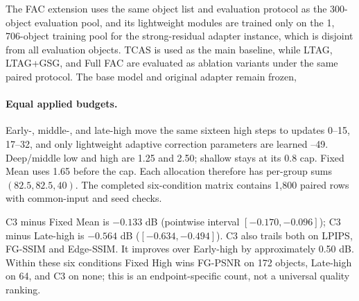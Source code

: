 \documentclass[times,twocolumn,final]{elsarticle}
\providecommand{\DIFadd}[1]{{\protect\color{blue} \sf #1}} %
\providecommand{\DIFdel}[1]{{\protect\color{red} \scriptsize #1}} %
\providecommand{\DIFaddbegin}{} %
\providecommand{\DIFaddend}{} %
\providecommand{\DIFdelbegin}{} %
\providecommand{\DIFdelend}{} %
\begin{document}
\DIFdelbegin \DIFdel{The FAC extension uses the same object list and evaluation protocol as the 300-object evaluation pool, and its lightweight modules are trained only on the 1, 706-object training pool for the strong-residual adapter instance, which is disjoint from all evaluation objects. TCAS is used as the main baseline, while LTAG, LTAG+GSG, and Full FAC are evaluated as ablation variants under the same paired protocol. The base model and original adapter remain frozen,}\DIFdelend \DIFaddbegin \paragraph{Equal applied budgets.}
\label{subsec:matched-budget300}
\DIFadd{Early-, middle-, and late-high move the same sixteen high steps to updates 0--15, 17--32, }\DIFaddend and \DIFdelbegin \DIFdel{only lightweight adaptive correction parameters are learned}\DIFdelend \DIFaddbegin \DIFadd{34--49. Deep/middle low and high are 1.25 and 2.50; shallow stays at its 0.8 cap. Fixed Mean uses 1.65 before the cap. Each allocation therefore has per-group sums $(82.5,82.5,40)$. The completed six-condition matrix contains 1,800 paired rows with common-input and seed checks}\DIFaddend .

\DIFdelbegin %
\DIFdelend \DIFaddbegin \DIFadd{C3 minus Fixed Mean is $-0.133$ dB (pointwise interval $[-0.170,-0.096]$); C3 minus Late-high is $-0.564$ dB ($[-0.634,-0.494]$). C3 also trails both on LPIPS, FG-SSIM and Edge-SSIM. It improves over Early-high by approximately 0.50 dB. Within these six conditions Fixed High wins FG-PSNR on 172 objects, Late-high on 64, and C3 on none; this is an endpoint-specific count, not a universal quality ranking.
}\DIFaddend 
\end{document}
